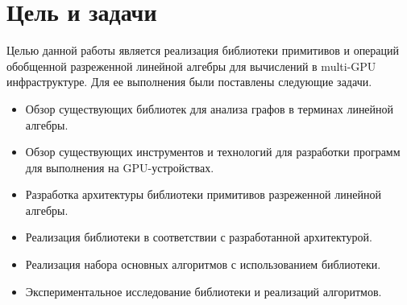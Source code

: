 \section{Цель и задачи}

Целью данной работы является реализация библиотеки примитивов и операций обобщенной разреженной линейной алгебры для вычислений в multi-GPU инфраструктуре. Для ее выполнения были поставлены следующие задачи.

\begin{itemize}
    \item Обзор существующих библиотек для анализа графов в терминах линейной алгебры.
    \item Обзор существующих инструментов и технологий для разработки программ для выполнения на GPU-устройствах.
    \item Разработка архитектуры библиотеки примитивов разреженной линейной алгебры.
    \item Реализация библиотеки в соответствии с разработанной архитектурой.
    \item Реализация набора основных алгоритмов с использованием библиотеки.
    \item Экспериментальное исследование библиотеки и реализаций алгоритмов.
\end{itemize}